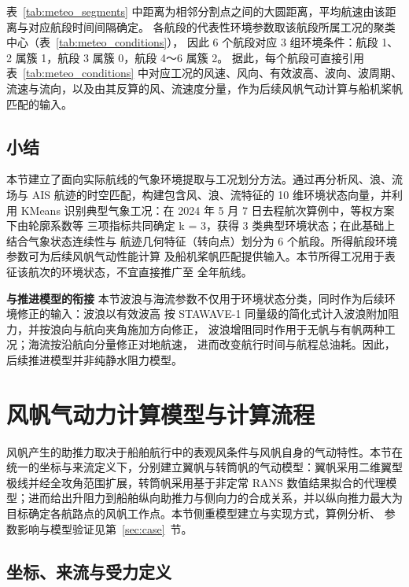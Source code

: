 \documentclass[UTF8,a4paper,twoside,zihao=5,fontset=windows]{ctexart}
\begin{document}
表~\ref{tab:meteo_segments} 中距离为相邻分割点之间的大圆距离，平均航速由该距离与对应航段时间间隔确定。
各航段的代表性环境参数取该航段所属工况的聚类中心（表~\ref{tab:meteo_conditions}），
因此 6 个航段对应 3 组环境条件：航段 1、2 属簇 1，航段 3 属簇 0，航段 4～6 属簇 2。
据此，每个航段可直接引用表~\ref{tab:meteo_conditions} 中对应工况的风速、风向、有效波高、波向、波周期、
流速与流向，以及由其反算的风、流速度分量，作为后续风帆气动计算与船机桨帆匹配的输入。

\subsection{小结}

本节建立了面向实际航线的气象环境提取与工况划分方法。通过再分析风、浪、流场与
AIS 航迹的时空匹配，构建包含风、浪、流特征的 10 维环境状态向量，并利用 KMeans
识别典型气象工况：在 2024 年 5 月 7 日去程航次算例中，等权方案下由轮廓系数等
三项指标共同确定 k = 3，获得 3 类典型环境状态；在此基础上结合气象状态连续性与
航迹几何特征（转向点）划分为 6 个航段。所得航段环境参数可为后续风帆气动性能计算
及船机桨帆匹配提供输入。本节所得工况用于表征该航次的环境状态，不宜直接推广至
全年航线。

\par\noindent\textbf{与推进模型的衔接}
本节波浪与海流参数不仅用于环境状态分类，同时作为后续环境修正的输入：波浪以有效波高
按 STAWAVE-1 同量级的简化式计入波浪附加阻力，并按浪向与航向夹角施加方向修正，
波浪增阻同时作用于无帆与有帆两种工况；海流按沿航向分量修正对地航速，
进而改变航行时间与航程总油耗。因此，后续推进模型并非纯静水阻力模型。

\section{风帆气动力计算模型与计算流程}
\label{sec:aero}
\label{sec:sail_aero}

风帆产生的助推力取决于船舶航行中的表观风条件与风帆自身的气动特性。本节在统一的坐标与来流定义下，分别建立翼帆与转筒帆的气动模型：翼帆采用二维翼型极线并经全攻角范围扩展，转筒帆采用基于非定常 RANS 数值结果拟合的代理模型；进而给出升阻力到船舶纵向助推力与侧向力的合成关系，并以纵向推力最大为目标确定各航路点的风帆工作点。本节侧重模型建立与实现方式，算例分析、
参数影响与模型验证见第~\ref{sec:case}~节。

\subsection{坐标、来流与受力定义}
\end{document}
